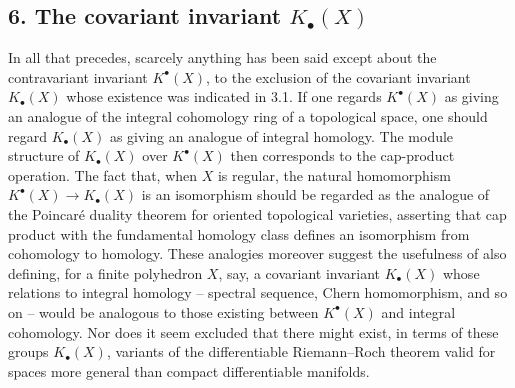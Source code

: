 \subsection*{6. The covariant invariant $K_\bullet(X)$}
In all that precedes, scarcely anything has been said except about the contravariant invariant $K^\bullet(X)$, to the exclusion of the covariant invariant $K_\bullet(X)$ whose existence was indicated in 3.1. If one regards $K^\bullet(X)$ as giving an analogue of the integral cohomology ring of a topological space, one should regard $K_\bullet(X)$ as giving an analogue of integral homology. The module structure of $K_\bullet(X)$ over $K^\bullet(X)$ then corresponds to the cap-product operation. The fact that, when $X$ is regular, the natural homomorphism $K^\bullet(X)\to K_\bullet(X)$ is an isomorphism should be regarded as the analogue of the Poincar\'e duality theorem for oriented topological varieties, asserting that cap product with the fundamental homology class defines an isomorphism from cohomology to homology. These analogies moreover suggest the usefulness of also defining, for a finite polyhedron $X$, say, a covariant invariant $K_\bullet(X)$ whose relations to integral homology -- spectral sequence, Chern homomorphism, and so on -- would be analogous to those existing between $K^\bullet(X)$ and integral cohomology. Nor does it seem excluded that there might exist, in terms of these groups $K_\bullet(X)$, variants of the differentiable Riemann--Roch theorem valid for spaces more general than compact differentiable manifolds.

